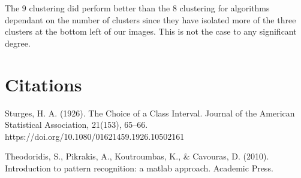 \documentclass[12pt, a4paper]{article}
\begin{document}
The $9$ clustering did perform better than the $8$ clustering for algorithms dependant on the number of clusters since they have isolated more of the three clusters at the bottom left of our images. This is not the case to any significant degree.
\newline

\section{Citations}

Sturges, H. A. (1926). The Choice of a Class Interval. Journal of the American Statistical Association, 21(153), 65–66. https://doi.org/10.1080/01621459.1926.10502161
\newline

Theodoridis, S., Pikrakis, A., Koutroumbas, K., & Cavouras, D. (2010). Introduction to pattern recognition: a matlab approach. Academic Press.
\newline
\end{document}
